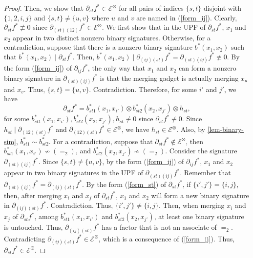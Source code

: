 \begin{proof}
Then, we show that  ${\partial}_{st}{f^{\ast}}\in {\mathcal{E}}^{\otimes}$ for all pairs of indices $\{s, t\}$ disjoint with $\{1, 2, i, j\}$ and $\{s, t\} \neq \{u, v\}$ where $u$ and $v$ are named in (\ref{form_ij}). 
Clearly, ${\partial}_{st}{f^{\ast}}\not\equiv 0$ since ${\partial}_{(st)(12)}{f^{\ast}}\in{\mathcal{E}}^{\otimes}$.
 We first show that in the UPF of ${\partial}_{st}{f^{\ast}}$, $x_1$ and $x_2$ appear in two distinct nonzero binary signatures. 
 Otherwise, for a contradiction, suppose that there is a nonzero binary signature ${b^\ast}(x_1, x_2)$ such that ${b^\ast}(x_1, x_2)\mid {\partial}_{st}{f^{\ast}}$. 
 Then, ${b^\ast}(x_1, x_2)\mid{\partial}_{(ij)(st)}{f^{\ast}}={\partial}_{(st)(ij)}{f^{\ast}}\not\equiv 0$. 
 By the form (\ref{form_ij}) of ${\partial}_{ij}{f^{\ast}}$,  
 the only way that $x_1$ and $x_2$ can form a nonzero binary signature in ${\partial}_{(st)(ij)}{f^{\ast}}$ is that the merging gadget is actually merging $x_u$ and $x_v$. Thus, $\{s, t\}=\{u, v\}$. Contradiction. 
Therefore, for some $i'$ and $j'$, we have 
\begin{equation}\label{form_st}
{\partial}_{st}{f^{\ast}}={b^\ast_{st1}}(x_1, x_{i'})\otimes {b^\ast_{st2}}(x_2, x_{j'})\otimes{h_{st}},
\end{equation}
for some ${b^\ast_{st1}}(x_1, x_{i'}),  {b^\ast_{st2}}(x_2, x_{j'}), {h_{st}} \not \equiv 0$ since  ${\partial}_{st}{f^{\ast}}\not\equiv 0$.
  Since ${h_{st}} \mid {\partial}_{(12)(st)}{f^\ast}$ and ${\partial}_{(12)(st)}{f^\ast}\in 
    {\mathcal{E}}^{\otimes}$, 
we have ${h_{st}} \in {\mathcal{E}}^{\otimes}$.
Also, by \cref{lem-binary-sim}, ${b^\ast_{st1}}  \sim \overline{b^\ast_{st2}}$.
For a contradiction,
suppose that ${\partial}_{st}{f^{\ast}}\notin {\mathcal{E}}^{\otimes}$, then  ${b^\ast_{st1}}(x_1, x_{i'}) 
\not\sim (=_2)$,
and ${b^\ast_{st2}}(x_2, x_{j'})  
\not\sim (=_2)$.
Consider the signature ${\partial}_{(st)(ij)}{f^{\ast}}$. 
Since $\{s, t\}\neq \{u, v\}$,  by the form (\ref{form_ij}) of ${\partial}_{ij}{f^{\ast}}$, 
$x_1$ and $x_2$ appear in two binary signatures in the UPF of ${\partial}_{(st)(ij)}{f^{\ast}}.$
Remember that ${\partial}_{(st)(ij)}{f^{\ast}}={\partial}_{(ij)(st)}{f^{\ast}}$.
By the form (\ref{form_st}) of ${\partial}_{st}{f^{\ast}}$, 
if
$\{i', j'\}= \{i, j\}$, 
then, after merging $x_i$ and $x_j$ of ${\partial}_{st}{f^{\ast}}$, $x_1$ and $x_2$ will form a new binary  signature in ${\partial}_{(ij)(st)}{f^{\ast}}$. Contradiction.
Thus, $\{i', j'\}\neq \{i, j\}$.
Then, when merging $x_i$ and $x_j$ of ${\partial}_{st}{f^{\ast}}$,
among ${b^\ast_{st1}}(x_1, x_{i'})$ and ${b^\ast_{st2}}(x_2, x_{j'})$, at least one binary signature is untouched. 
Thus, ${\partial}_{(ij)(st)}{f^{\ast}}$ has a factor that is not an associate of $=_2$. 
Contradicting ${\partial}_{(ij)(st)}{f^{\ast}}\in {\mathcal{E}}^{\otimes}$,
which is a consequence of (\ref{form_ij}).
Thus, ${\partial}_{st}{f^{\ast}}\in {\mathcal{E}}^{\otimes}$.


\end{proof}
